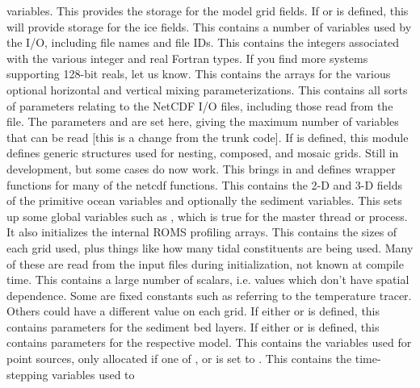 \begin{klist}
    variables.
   This provides the storage for the model grid fields. 
   If  or  is
    defined, this will provide storage for the ice fields.
   This contains a number of variables used by the
    I/O, including file names and file IDs.
    This contains the integers associated with the
    various integer and real Fortran types. If you find more systems
    supporting 128-bit reals, let us know.
   This contains the arrays for the various
    optional horizontal and vertical mixing parameterizations.
   This contains all sorts of parameters relating to
    the NetCDF I/O files, including those read from the 
    file. The parameters  and  are set here, giving
    the maximum number of variables that can be read [this is a change
    from the trunk code].
   If  is defined, this module defines
    generic structures used for nesting, composed, and mosaic grids.
    Still in development, but some cases do now work.
   This brings in  and defines
    wrapper functions for many of the netcdf functions.
   This contains the 2-D and 3-D fields of the primitive
    ocean variables and optionally the sediment variables.
   This sets up some global variables such as
    , which is true for the master thread or
    process. It also initializes the internal ROMS profiling arrays.
   This contains the sizes of each grid used, plus
    things like how many tidal constituents are being used. Many of these are
    read from the input files during initialization, not known at compile
    time.
   This contains a large number of scalars, i.e. values
    which don't have spatial dependence. Some are fixed constants such
    as  referring to the temperature tracer. Others could
    have a different value on each grid.
   If either  or 
    is defined, this contains parameters for the sediment bed layers.
   If either  or 
    is defined, this contains parameters for the respective model.
   This contains the variables used for point
    sources, only allocated if one of , 
    or  is set to .
   This contains the time-stepping variables used to

\end{klist}
